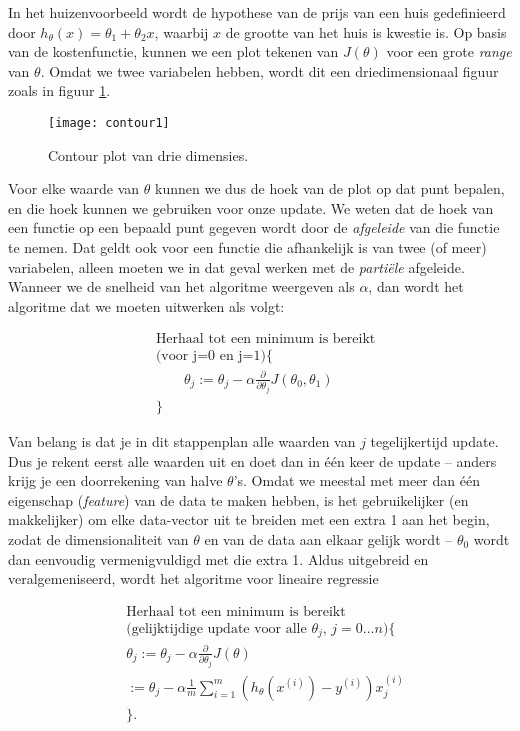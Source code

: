 In het huizenvoorbeeld wordt de hypothese van de prijs van een huis gedefinieerd door $h_{\theta}(x) = \theta_1 + \theta_2x$, waarbij $x$ de grootte van het huis is kwestie is. Op basis van de kostenfunctie, kunnen we een plot tekenen van $J(\theta)$ voor een grote \textit{range} van $\theta$. Omdat we twee variabelen hebben, wordt dit een driedimensionaal figuur zoals in figuur \ref{img:contour1}.

\begin{figure}[h]
\centering
\texttt{[image: contour1]}
\caption{Contour plot van drie dimensies.\label{img:contour1}}
\end{figure}

Voor elke waarde van $\theta$ kunnen we dus de hoek van de plot op dat punt bepalen, en die hoek kunnen we gebruiken voor onze update. We weten dat de hoek van een functie op een bepaald punt gegeven wordt door de \textit{afgeleide} van die functie te nemen. Dat geldt ook voor een functie die afhankelijk is van twee (of meer) variabelen, alleen moeten we in dat geval werken met de \textit{partiële} afgeleide. Wanneer we de snelheid van het algoritme weergeven als $\alpha$, dan wordt het algoritme dat we moeten uitwerken als volgt:

\[
\begin{aligned}
&\textrm{Herhaal tot een minimum is bereikt} \\
& \textrm{(voor j=0 en j=1)} \{ \\
& \qquad\theta_j := \theta_j - \alpha \frac{\partial}{\partial\theta_j}J(\theta_0, \theta_1)\\
&\} 
\end{aligned}
\]

Van belang is dat je in dit stappenplan alle waarden van $j$ tegelijkertijd update. Dus je rekent eerst alle waarden uit en doet dan in één keer de update – anders krijg je een doorrekening van halve $\theta$'s. Omdat we meestal met meer dan één eigenschap (\textit{feature}) van de data te maken hebben, is het gebruikelijker (en makkelijker) om elke data-vector uit te breiden met een extra 1 aan het begin, zodat de dimensionaliteit van $\theta$ en van de data aan elkaar gelijk wordt – $\theta_0$ wordt dan eenvoudig vermenigvuldigd met die extra 1. Aldus uitgebreid en veralgemeniseerd, wordt het algoritme voor lineaire regressie

\[
\begin{aligned}
& \textrm{Herhaal tot een minimum is bereikt}\\
& \textrm{(gelijktijdige update voor alle $\theta_j$, $j=0 \hdots n$)}\{\\
& \theta_j := \theta_j - \alpha \frac{\partial}{{\partial}{\theta_j}}J(\theta) \\
& := \theta_j - \alpha \frac{1}{m}\sum_{i=1}^{m} (h_\theta(x^{(i)}) - y^{(i)})x_j^{(i)}\\
&\} .
\end{aligned}
\]

